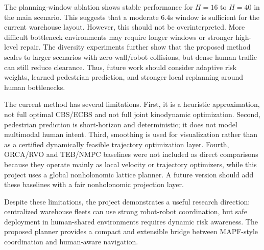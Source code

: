 \documentclass[10pt,twocolumn,letterpaper]{article}
\begin{document}
The planning-window ablation shows stable performance for $H=16$ to $H=40$ in the main scenario. This suggests that a moderate $6.4$s window is sufficient for the current warehouse layout. However, this should not be overinterpreted. More difficult bottleneck environments may require longer windows or stronger high-level repair. The diversity experiments further show that the proposed method scales to larger scenarios with zero wall/robot collisions, but dense human traffic can still reduce clearance. Thus, future work should consider adaptive risk weights, learned pedestrian prediction, and stronger local replanning around human bottlenecks.

The current method has several limitations. First, it is a heuristic approximation, not full optimal CBS/ECBS and not full joint kinodynamic optimization. Second, pedestrian prediction is short-horizon and deterministic; it does not model multimodal human intent. Third, smoothing is used for visualization rather than as a certified dynamically feasible trajectory optimization layer. Fourth, ORCA/RVO and TEB/NMPC baselines were not included as direct comparisons because they operate mainly as local velocity or trajectory optimizers, while this project uses a global nonholonomic lattice planner. A future version should add these baselines with a fair nonholonomic projection layer.

Despite these limitations, the project demonstrates a useful research direction: centralized warehouse fleets can use strong robot-robot coordination, but safe deployment in human-shared environments requires dynamic risk awareness. The proposed planner provides a compact and extensible bridge between MAPF-style coordination and human-aware navigation.
\end{document}
